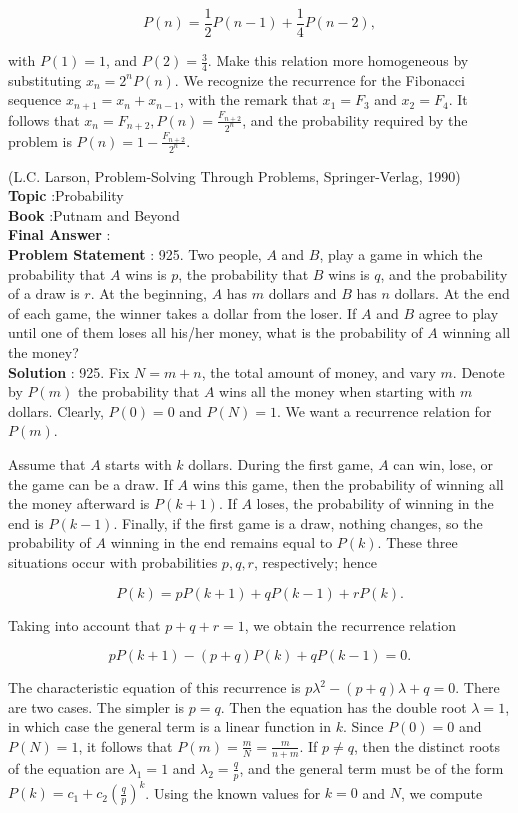 \documentclass[10pt]{article}
\begin{document}
$$
P(n)=\frac{1}{2} P(n-1)+\frac{1}{4} P(n-2),
$$

with $P(1)=1$, and $P(2)=\frac{3}{4}$. Make this relation more homogeneous by substituting $x_{n}=2^{n} P(n)$. We recognize the recurrence for the Fibonacci sequence $x_{n+1}=x_{n}+x_{n-1}$, with the remark that $x_{1}=F_{3}$ and $x_{2}=F_{4}$. It follows that $x_{n}=F_{n+2}, P(n)=\frac{F_{n+2}}{2^{n}}$, and the probability required by the problem is $P(n)=1-\frac{F_{n+2}}{2^{n}}$.

(L.C. Larson, Problem-Solving Through Problems, Springer-Verlag, 1990)
\\
\textbf{Topic} :Probability\\
\textbf{Book} :Putnam and Beyond\\
\textbf{Final Answer} :\\


\textbf{Problem Statement} :
925. Two people, $A$ and $B$, play a game in which the probability that $A$ wins is $p$, the probability that $B$ wins is $q$, and the probability of a draw is $r$. At the beginning, $A$ has $m$ dollars and $B$ has $n$ dollars. At the end of each game, the winner takes a dollar from the loser. If $A$ and $B$ agree to play until one of them loses all his/her money, what is the probability of $A$ winning all the money?
\\
\textbf{Solution} :
925. Fix $N=m+n$, the total amount of money, and vary $m$. Denote by $P(m)$ the probability that $A$ wins all the money when starting with $m$ dollars. Clearly, $P(0)=0$ and $P(N)=1$. We want a recurrence relation for $P(m)$.

Assume that $A$ starts with $k$ dollars. During the first game, $A$ can win, lose, or the game can be a draw. If $A$ wins this game, then the probability of winning all the money afterward is $P(k+1)$. If $A$ loses, the probability of winning in the end is $P(k-1)$. Finally, if the first game is a draw, nothing changes, so the probability of $A$ winning in the end remains equal to $P(k)$. These three situations occur with probabilities $p, q, r$, respectively; hence 

$$
P(k)=p P(k+1)+q P(k-1)+r P(k) .
$$

Taking into account that $p+q+r=1$, we obtain the recurrence relation

$$
p P(k+1)-(p+q) P(k)+q P(k-1)=0 .
$$

The characteristic equation of this recurrence is $p \lambda^{2}-(p+q) \lambda+q=0$. There are two cases. The simpler is $p=q$. Then the equation has the double root $\lambda=1$, in which case the general term is a linear function in $k$. Since $P(0)=0$ and $P(N)=1$, it follows that $P(m)=\frac{m}{N}=\frac{m}{n+m}$. If $p \neq q$, then the distinct roots of the equation are $\lambda_{1}=1$ and $\lambda_{2}=\frac{q}{p}$, and the general term must be of the form $P(k)=c_{1}+c_{2}\left(\frac{q}{p}\right)^{k}$. Using the known values for $k=0$ and $N$, we compute
\end{document}

